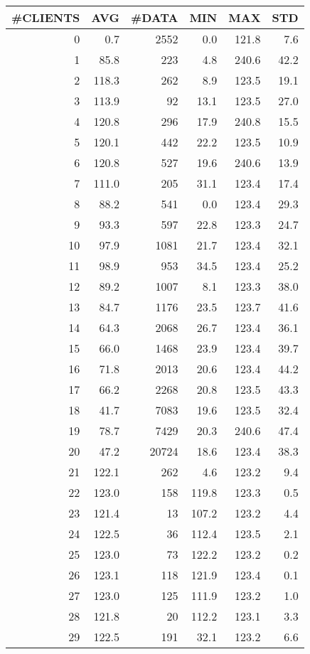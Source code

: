 \begin{tabular}{|r|r|r|r|r|r|}
\hline
 \#CLIENTS & AVG & \#DATA & MIN & MAX & STD\\
\hline
0 &  0.7 & 2552 & 0.0 & 121.8 & 7.6\\
1 &  85.8 & 223 & 4.8 & 240.6 & 42.2\\
2 &  118.3 & 262 & 8.9 & 123.5 & 19.1\\
3 &  113.9 & 92 & 13.1 & 123.5 & 27.0\\
4 &  120.8 & 296 & 17.9 & 240.8 & 15.5\\
5 &  120.1 & 442 & 22.2 & 123.5 & 10.9\\
6 &  120.8 & 527 & 19.6 & 240.6 & 13.9\\
7 &  111.0 & 205 & 31.1 & 123.4 & 17.4\\
8 &  88.2 & 541 & 0.0 & 123.4 & 29.3\\
9 &  93.3 & 597 & 22.8 & 123.3 & 24.7\\
10 &  97.9 & 1081 & 21.7 & 123.4 & 32.1\\
11 &  98.9 & 953 & 34.5 & 123.4 & 25.2\\
12 &  89.2 & 1007 & 8.1 & 123.3 & 38.0\\
13 &  84.7 & 1176 & 23.5 & 123.7 & 41.6\\
14 &  64.3 & 2068 & 26.7 & 123.4 & 36.1\\
15 &  66.0 & 1468 & 23.9 & 123.4 & 39.7\\
16 &  71.8 & 2013 & 20.6 & 123.4 & 44.2\\
17 &  66.2 & 2268 & 20.8 & 123.5 & 43.3\\
18 &  41.7 & 7083 & 19.6 & 123.5 & 32.4\\
19 &  78.7 & 7429 & 20.3 & 240.6 & 47.4\\
20 &  47.2 & 20724 & 18.6 & 123.4 & 38.3\\
21 &  122.1 & 262 & 4.6 & 123.2 & 9.4\\
22 &  123.0 & 158 & 119.8 & 123.3 & 0.5\\
23 &  121.4 & 13 & 107.2 & 123.2 & 4.4\\
24 &  122.5 & 36 & 112.4 & 123.5 & 2.1\\
25 &  123.0 & 73 & 122.2 & 123.2 & 0.2\\
26 &  123.1 & 118 & 121.9 & 123.4 & 0.1\\
27 &  123.0 & 125 & 111.9 & 123.2 & 1.0\\
28 &  121.8 & 20 & 112.2 & 123.1 & 3.3\\
29 &  122.5 & 191 & 32.1 & 123.2 & 6.6\\

\end{tabular}
